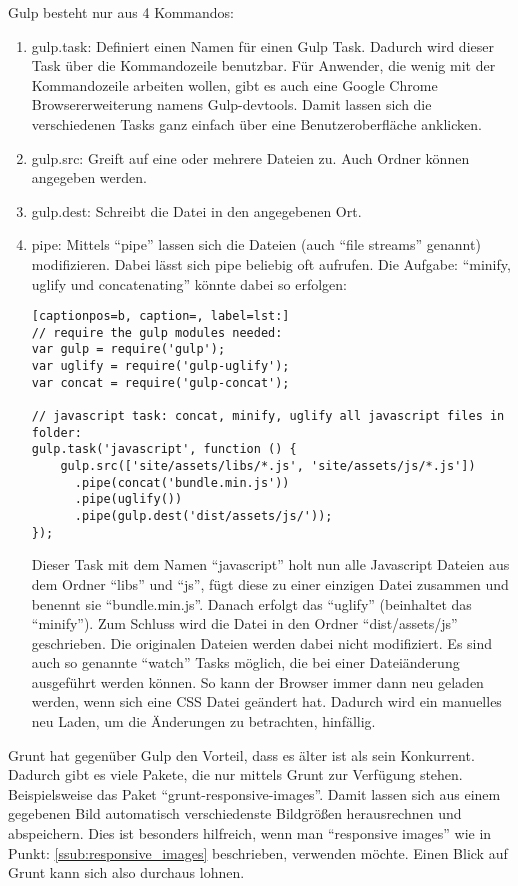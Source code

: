		Gulp besteht nur aus 4 Kommandos:
		\begin{enumerate}
			\item gulp.task: Definiert einen Namen für einen Gulp Task. Dadurch wird dieser Task über die Kommandozeile benutzbar. Für Anwender, die wenig mit der Kommandozeile arbeiten wollen, gibt es auch eine Google Chrome Browsererweiterung namens Gulp-devtools. Damit lassen sich die verschiedenen Tasks ganz einfach über eine Benutzeroberfläche anklicken.
			\item gulp.src: Greift auf eine oder mehrere Dateien zu. Auch Ordner können angegeben werden.
			\item gulp.dest: Schreibt die Datei in den angegebenen Ort.
			\item pipe: Mittels "`pipe"' lassen sich die Dateien (auch "`file streams"'  genannt) modifizieren. Dabei lässt sich pipe beliebig oft aufrufen. Die Aufgabe: "`minify, uglify und concatenating"' könnte dabei so erfolgen:
			\begin{lstlisting}[captionpos=b, caption=, label=lst:]
// require the gulp modules needed:
var gulp = require('gulp');
var uglify = require('gulp-uglify');
var concat = require('gulp-concat');

// javascript task: concat, minify, uglify all javascript files in folder:
gulp.task('javascript', function () {
    gulp.src(['site/assets/libs/*.js', 'site/assets/js/*.js'])
      .pipe(concat('bundle.min.js')) 
      .pipe(uglify())
      .pipe(gulp.dest('dist/assets/js/'));
});
			\end{lstlisting}
			Dieser Task mit dem Namen "`javascript"' holt nun alle Javascript Dateien aus dem Ordner "`libs"' und "`js"', fügt diese zu einer einzigen Datei zusammen und benennt sie "`bundle.min.js"'. Danach erfolgt das "`uglify"' (beinhaltet das "`minify"'). Zum Schluss wird die Datei in den Ordner "`dist/assets/js"' geschrieben. Die originalen Dateien werden dabei nicht modifiziert. Es sind auch so genannte "`watch"' Tasks möglich, die bei einer Dateiänderung ausgeführt werden können. So kann der Browser immer dann neu geladen werden, wenn sich eine CSS Datei geändert hat. Dadurch wird ein manuelles neu Laden, um die Änderungen zu betrachten, hinfällig.	
		\end{enumerate}

		Grunt hat gegenüber Gulp den Vorteil, dass es älter ist als sein Konkurrent. Dadurch gibt es viele Pakete, die nur mittels Grunt zur Verfügung stehen. Beispielsweise das Paket "`grunt-responsive-images"'. Damit lassen sich aus einem gegebenen Bild automatisch verschiedenste Bildgrößen herausrechnen und abspeichern. Dies ist besonders hilfreich, wenn man "`responsive images"' wie in Punkt: \ref{ssub:responsive_images} beschrieben, verwenden möchte. Einen Blick auf Grunt kann sich also durchaus lohnen.\\
		
